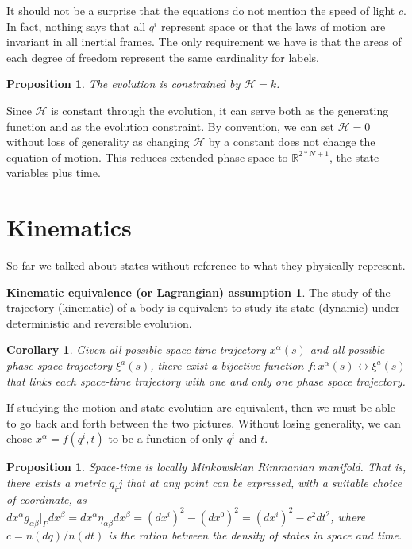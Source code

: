 \documentclass[aps,pra,10pt,twocolumn,floatfix,nofootinbib]{revtex4-1}
\newtheorem{cor}[thm]{Corollary}
\newtheorem{prop}[thm]{Proposition}
\theoremstyle{definition}
\newtheorem*{assump3}{Kinematic equivalence (or Lagrangian) assumption}
\begin{document}
It should not be a surprise that the equations do not mention the speed of light $c$. In fact, nothing says that all $q^i$ represent space or that the laws of motion are invariant in all inertial frames. The only requirement we have is that the areas of each degree of freedom represent the same cardinality for labels.

\begin{prop}\label{tdofConstrain}
The evolution is constrained by $\mathcal{H}=k$.
\end{prop}

Since $\mathcal{H}$ is constant through the evolution, it can serve both as the generating function and as the evolution constraint. By convention, we can set $\mathcal{H}=0$ without loss of generality as changing $\mathcal{H}$ by a constant does not change the equation of motion. This reduces extended phase space to $\mathbb{R}^{2*N + 1}$, the state variables plus time.

\section{Kinematics}
So far we talked about states without reference to what they physically represent.

\begin{assump3}\label{kinematicAssumption}
The study of the trajectory (kinematic) of a body is equivalent to study its state (dynamic) under deterministic and reversible evolution.
\end{assump3}

\begin{cor}\label{}
Given all possible space-time trajectory $x^\alpha(s)$ and all possible phase space trajectory $\xi^a(s)$, there exist a bijective function $f: x^\alpha(s) \leftrightarrow \xi^a(s)$ that links each space-time trajectory with one and only one phase space trajectory.
\end{cor}

If studying the motion and state evolution are equivalent, then we must be able to go back and forth between the two pictures. Without losing generality, we can chose $x^\alpha=f(q^i,t)$ to be a function of only $q^i$ and $t$.

\begin{prop}\label{locallyMinkowski}
Space-time is locally Minkowskian Rimmanian manifold. That is, there exists a metric $g_ij$ that at any point can be expressed, with a suitable choice of coordinate, as $dx^\alpha g_{\alpha \beta}|_P dx^\beta=dx^\alpha\eta_{\alpha \beta}dx^\beta=(dx^i)^2 - (dx^0)^2=(dx^i)^2 - c^2dt^2$, where $c=n(dq)/n(dt)$ is the ration between the density of states in space and time.
\end{prop}
\end{document}
